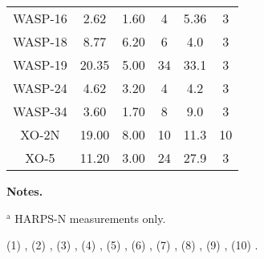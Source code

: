 \begin{table*}
\begin{tabular}{cccccc}
    WASP-16 & 2.62 & 1.60 & 4 & 5.36 & 3 \\
    WASP-18 & 8.77 & 6.20 & 6 & 4.0 & 3 \\
    WASP-19 & 20.35 & 5.00 & 34 & 33.1 & 3 \\
    WASP-24 & 4.62 & 3.20 & 4 & 4.2 & 3 \\
    WASP-34 & 3.60 & 1.70 & 8 & 9.0 & 3 \\
    XO-2N & 19.00 & 8.00 & 10 & 11.3 & 10 \\
    XO-5 & 11.20 & 3.00 & 24 & 27.9 & 3
  \end{tabular}
  \begin{list}{}{}
  \item {\bf {Notes.}}
    \item$^{\text{a}}$ HARPS-N measurements only.
    \item (1) \cite{berta15}, (2) \cite{charbonneau09}, (3) \cite{knutson14}, (4) \cite{howard11}, (5) \cite{bouchy05}, (6) \cite{vanderburg15}, (7) \cite{weiss16}, (8) \cite{howard13}, (9) \cite{dressing15b}, (10) \cite{burke07}.
  \end{list}
\end{table*}
